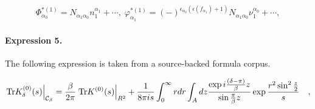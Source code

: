 \documentclass[11pt]{article}
\begin{document}
\begin{align*}\Phi _{\alpha _{0}}^{*(1)}=N_{\alpha _{1}\alpha _{0}}n_{1}^{\alpha_{1}}+\cdots ,\;\varphi _{\alpha _{1}}^{*(1)}=\left( -\right) ^{\epsilon_{\alpha _{0}}\left( \epsilon \left( f_{\alpha _{1}}\right) +1\right)}N_{\alpha _{1}\alpha _{0}}\nu _{1}^{\alpha _{0}}+\cdots , \end{align*}

\paragraph{Expression 5.} The following expression is taken from a source-backed formula corpus.

\begin{align*}\left.\text{Tr}K^{(0)}_{\delta}(s)\right|_{{\cal C}_\beta}={\beta \over 2\pi}\left.\text{Tr}K^{(0)}(s)\right|_{R^2}+{1 \over 8\pi is}\int_{0}^{\infty} rdr\int_{A}dz{\exp i{(\delta-\pi) \over \beta}z \over \sin{\pi \over \beta}z}\exp{r^2\sin^2{z \over 2} \over s}~~~,\end{align*}
\end{document}
